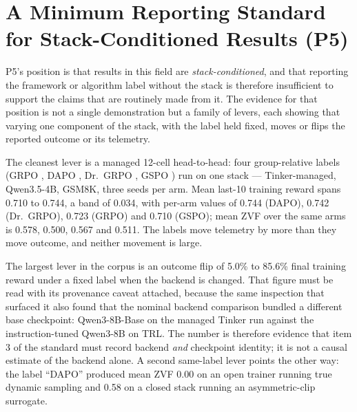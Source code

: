 \documentclass[12pt,a4paper]{report}
\begin{document}
\section{A Minimum Reporting Standard for Stack-Conditioned Results
(P5)}\label{a-minimum-reporting-standard-for-stack-conditioned-results-p5}

P5's position is that results in this field are
\emph{stack-conditioned}, and that reporting the framework or algorithm
label without the stack is therefore insufficient to support the claims
that are routinely made from it. The evidence for that position is not a
single demonstration but a family of levers, each showing that varying
one component of the stack, with the label held fixed, moves or flips
the reported outcome or its telemetry.

The cleanest lever is a managed 12-cell head-to-head: four
group-relative labels (GRPO \citep{shao2024deepseekmath}, DAPO
\citep{yu2025dapo}, Dr.~GRPO \citep{liu2025understanding}, GSPO
\citep{zheng2025gspo}) run on one stack --- Tinker-managed, Qwen3.5-4B,
GSM8K, three seeds per arm. Mean last-10 training reward spans 0.710 to
0.744, a band of 0.034, with per-arm values of 0.744 (DAPO), 0.742
(Dr.~GRPO), 0.723 (GRPO) and 0.710 (GSPO); mean ZVF over the same arms
is 0.578, 0.500, 0.567 and 0.511. The labels move telemetry by more than
they move outcome, and neither movement is large.

The largest lever in the corpus is an outcome flip of 5.0\% to 85.6\%
final training reward under a fixed label when the backend is changed.
That figure must be read with its provenance caveat attached, because
the same inspection that surfaced it also found that the nominal backend
comparison bundled a different base checkpoint: Qwen3-8B-Base on the
managed Tinker run against the instruction-tuned Qwen3-8B on TRL. The
number is therefore evidence that item 3 of the standard must record
backend \emph{and} checkpoint identity; it is not a causal estimate of
the backend alone. A second same-label lever points the other way: the
label ``DAPO'' produced mean ZVF 0.00 on an open trainer running true
dynamic sampling and 0.58 on a closed stack running an asymmetric-clip
surrogate.
\end{document}
